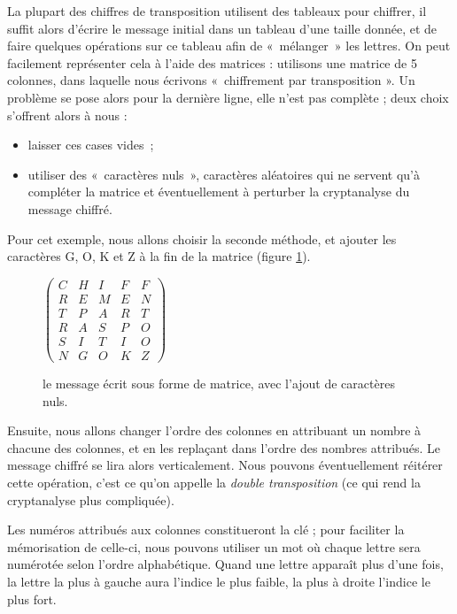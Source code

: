 La plupart des chiffres de transposition utilisent des tableaux pour
chiffrer, il suffit alors d'écrire le message initial dans un tableau
d'une taille donnée, et de faire quelques opérations sur ce tableau
afin de «~mélanger~» les lettres. On peut facilement représenter cela
à l'aide des matrices : utilisons une matrice de 5
colonnes, dans laquelle nous écrivons «~chiffrement par transposition
». Un problème se pose alors pour la dernière ligne, elle n'est pas
complète ; deux choix s'offrent alors à nous : 
\begin{itemize}
  \item laisser ces cases vides~;
  \item utiliser des «~caractères nuls~», caractères aléatoires qui ne
    servent qu'à compléter la matrice et éventuellement à perturber la
    cryptanalyse du message chiffré.
\end{itemize}
Pour cet exemple, nous allons choisir la seconde méthode, et ajouter
les caractères G, O, K et Z à la fin de la matrice (figure
\ref{fig:TranspositionMatriceNul}).
\begin{figure}[h]
  \begin{center}
  $
  \left(
    \begin{array}{ccccc}
      C & H & I & F & F \\
      R & E & M & E & N \\
      T & P & A & R & T \\
      R & A & S & P & O \\
      S & I & T & I & O \\
      N & G & O & K & Z 
    \end{array}
  \right)
  $
  \end{center}
  \caption{le message écrit sous forme de matrice, avec l'ajout de
    caractères nuls.}
  \label{fig:TranspositionMatriceNul}
\end{figure}

Ensuite, nous allons changer l'ordre des colonnes en attribuant un
nombre à chacune des colonnes, et en les replaçant dans l'ordre des
nombres attribués. Le message chiffré se lira alors verticalement.
Nous pouvons éventuellement réitérer cette opération, c'est ce qu'on
appelle la \emph{double transposition} (ce qui rend la cryptanalyse plus
compliquée).

Les numéros attribués aux colonnes constitueront la clé ; pour
faciliter la mémorisation de celle-ci, nous pouvons utiliser un mot
où chaque lettre sera numérotée selon l'ordre alphabétique. Quand une
lettre apparaît plus d'une fois, la lettre la plus à gauche aura
l'indice le plus faible, la plus à droite l'indice le plus fort.

